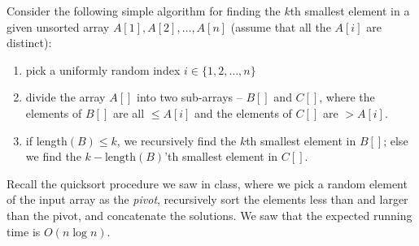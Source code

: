 \documentclass[addpoints]{exam}
\begin{document}
\begin{questions}
\begin{parts}
\part

\part

\end{parts}

Consider the following simple algorithm for finding the $k$th smallest element in a given unsorted array $A[1], A[2], \dots, A[n]$ (assume that all the $A[i]$ are distinct):
\begin{enumerate}
\item pick a uniformly random index $i \in \{1, 2, \dots, n\}$
\item divide the array $A[]$ into two sub-arrays -- $B[]$ and $C[]$, where the elements of $B[]$ are all $\le A[i]$ and the elements of $C[]$ are $> A[i]$. 
\item if length$(B) \le k$, we recursively find the $k$th smallest element in $B[]$; else we find the $k - \text{length}(B)$'th smallest element in $C[]$.
\end{enumerate}


Recall the quicksort procedure we saw in class, where we pick a random element of the input array as the {\em pivot}, recursively sort the elements less than and larger than the pivot, and concatenate the solutions.  We saw that the expected running time is $O(n \log n)$.  


\end{questions}
\end{document}

